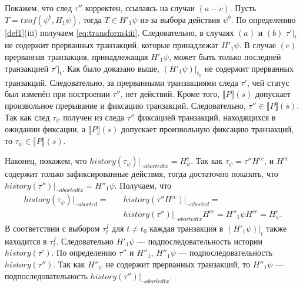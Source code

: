\begin{myproof}
Покажем, что след $\tau''$ корректен, ссылаясь на случаи $(a-c)$. Пусть $T = txof(\psi^b, H_1\psi)$, тогда $T \in H'_1\psi$ из-за выбора действия $\psi^b$. По определению \ref{def1}(iii) %
получаем \eqref{eq:transform4iii}. Следовательно, в случаях $(a)$ и $(b)$ $\tau'|_t$ не содержит прерванных транзакций, которые принадлежат $H'_1\psi$. В случае $(c)$ прерванная транзакция, принадлежащая $H'_1\psi$, может быть только последней транзакцией $\tau'|_t$. Как было доказано выше, $(H'_1\psi)|_{t_0}$ не содержит прерванных транзакций. Следовательно, за прерванными транзакциями следа $\tau'$, чей статус был изменён при построении $\tau''$, нет действий. Кроме того, $\llbracket P\rrbracket(s)$ допускает произвольное прерывание и фиксацию транзакций. Следовательно, $\tau'' \in \llbracket P\rrbracket(s)$. Так как след $\tau_{\psi}$ получен из следа $\tau''$ фиксацией транзакций, находящихся в ожидании фиксации, а $\llbracket P\rrbracket(s)$ допускает произвольную фиксацию транзакций, то  $\tau_{\psi} \in \llbracket P\rrbracket(s)$.

Наконец, покажем, что $history(\tau_{\psi})|_{\neg abortedtx} = H^c_{\psi}$. Так как $\tau_{\psi} = \tau''H^{cc}$, и $H^{cc}$ содержит только зафиксированные действия, тогда достаточно показать, что $history(\tau'')|_{\neg abortedtx} = H''_1\psi$. Получаем, что
\begin{align*}
history(\tau_{\psi})|_{\neg aborted} = &\quad history(\tau''H^{cc})|_{\neg aborted} = \\
                                 &\quad history(\tau'')|_{\neg abortedtx}H^{cc} = H''_1{\psi}H^{cc} =H^c_{\psi}.
\end{align*}
В соответствии с выбором $\tau^I_t$ для $t \neq t_0$ каждая транзакция в $(H'_1\psi)|_t$ также находится в $\tau^I_t$. Следовательно $H'_1\psi$ --- подпоследовательность истории $history(\tau')$. По определению $\tau''$ и $H''_1$, $H''_1\psi$ --- подпоследовательность $history(\tau'')$. Так как $H''_{\psi}$ не содержит прерванных транзакций, то $H''_1\psi$ --- подпоследовательность $history(\tau'')|_{\neg abortedtx}$.


\end{myproof}
